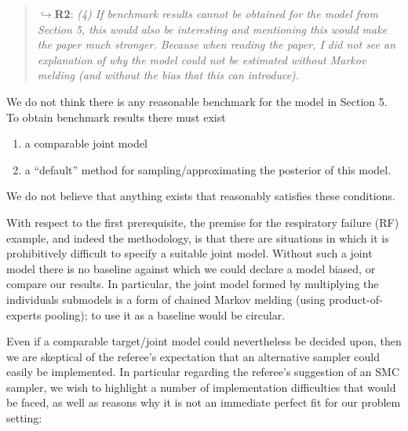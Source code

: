 \documentclass[
  10pt,
  a4paper,
]{article}
\providecommand{\tightlist}{%
  \setlength{\itemsep}{0pt}\setlength{\parskip}{0pt}}
\begin{document}
\begin{quote}
\(\hookrightarrow\)\textbf{R2}: \emph{(4) If benchmark results cannot be
obtained for the model from Section 5, this would also be interesting
and mentioning this would make the paper much stronger. Because when
reading the paper, I did not see an explanation of why the model could
not be estimated without Markov melding (and without the bias that this
can introduce).}
\end{quote}

We do not think there is any reasonable benchmark for the model in
Section 5. To obtain benchmark results there must exist

\begin{enumerate}
\def\labelenumi{\arabic{enumi}.}
\tightlist
\item
  a comparable joint model
\item
  a ``default'' method for sampling/approximating the posterior of this
  model.
\end{enumerate}

We do not believe that anything exists that reasonably satisfies these
conditions.

With respect to the first prerequisite, the premise for the respiratory
failure (RF) example, and indeed the methodology, is that there are
situations in which it is prohibitively difficult to specify a suitable
joint model. Without such a joint model there is no baseline against
which we could declare a model biased, or compare our results. In
particular, the joint model formed by multiplying the individuals
submodels is a form of chained Markov melding (using product-of-experts
pooling); to use it as a baseline would be circular.

Even if a comparable target/joint model could nevertheless be decided
upon, then we are skeptical of the referee's expectation that an
alternative sampler could easily be implemented. In particular regarding
the referee's suggestion of an SMC sampler, we wish to highlight a
number of implementation difficulties that would be faced, as well as
reasons why it is not an immediate perfect fit for our problem setting:
\end{document}
